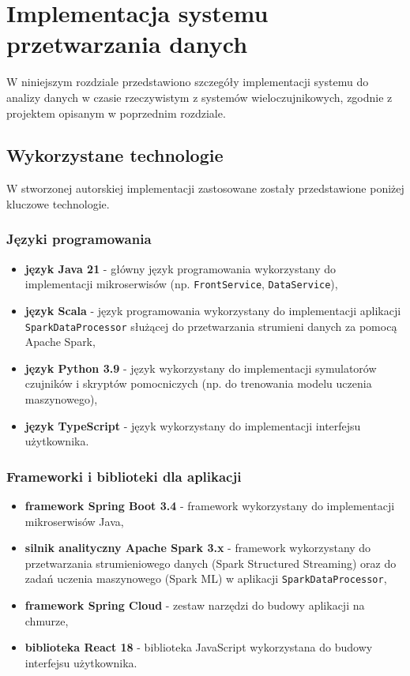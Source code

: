 \section{Implementacja systemu przetwarzania danych}
\label{sec:implementacja_systemu}

W niniejszym rozdziale przedstawiono szczegóły implementacji systemu do analizy danych w czasie rzeczywistym z systemów wieloczujnikowych,
zgodnie z projektem opisanym w poprzednim rozdziale.

\subsection{Wykorzystane technologie}
\label{subsec:technologie}

W stworzonej autorskiej implementacji zastosowane zostały przedstawione poniżej kluczowe technologie.

\subsubsection{Języki programowania}
\label{subsubsec:jezyki_programowania}

\begin{itemize}
    \item \textbf{język Java 21} - główny język programowania wykorzystany do implementacji mikroserwisów (np. \texttt{FrontService}, \texttt{DataService}),
    \item \textbf{język Scala} - język programowania wykorzystany do implementacji aplikacji \texttt{SparkDataProcessor} służącej do przetwarzania strumieni danych za pomocą Apache Spark,
    \item \textbf{język Python 3.9} - język wykorzystany do implementacji symulatorów czujników i skryptów pomocniczych (np. do trenowania modelu uczenia maszynowego),
    \item \textbf{język TypeScript} - język wykorzystany do implementacji interfejsu użytkownika.
\end{itemize}

\subsubsection{Frameworki i biblioteki dla aplikacji}
\label{subsubsec:frameworki}

\begin{itemize}
    \item \textbf{framework Spring Boot 3.4} - framework wykorzystany do implementacji mikroserwisów Java,
    \item \textbf{silnik analityczny Apache Spark 3.x} \cite{spark_streaming} - framework wykorzystany do przetwarzania strumieniowego danych (Spark Structured Streaming) \cite{chambers2018spark} oraz do zadań uczenia maszynowego (Spark ML) w aplikacji \texttt{SparkDataProcessor},
    \item \textbf{framework Spring Cloud} - zestaw narzędzi do budowy aplikacji na chmurze,
    \item \textbf{biblioteka React 18} - biblioteka JavaScript wykorzystana do budowy interfejsu użytkownika.
\end{itemize}

